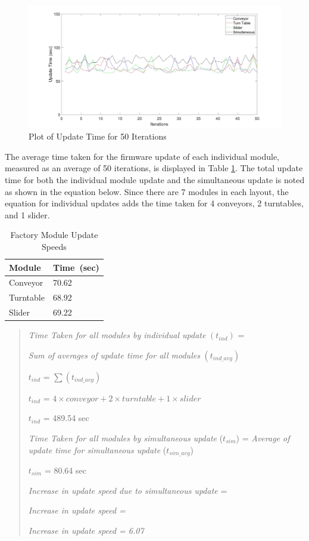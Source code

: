 \begin{figure}
    \centering
    \includegraphics[scale=0.2]{images/UpdateTimes.jpg}
    \caption{Plot of Update Time for 50 Iterations}
    \label{fig:updateTimes}
\end{figure}

The average time taken for the firmware update of each individual module, measured as an average of 50 iterations, is displayed in Table \ref{tab:speed}. The total update time for both the individual module update and the simultaneous update is noted as shown in the equation below. Since there are 7 modules in each layout, the equation for individual updates adds the time taken for 4 conveyors, 2 turntables, and 1 slider.

\begin{table}[h!]
    \centering
\begin{tabular}{ | m{3cm} | m{2cm} | } 
  \hline
  \textbf{Module}&\textbf{Time\ (sec)} \\ 
  \hline
  Conveyor&70.62 \\ 
  \hline
  Turntable& 68.92 \\ 
  \hline
  Slider&69.22 \\
  \hline
\end{tabular}
    \caption{Factory Module Update Speeds}
    \label{tab:speed}
\end{table}

\begin{quote}
           \textit{Time Taken for all modules by individual update} $(t_{ind})$ =
       
       \textit{Sum of averages of update time for all modules} $(t_{ind\_avg})$

     \centering  $t_{ind}$ = $\sum(t_{ind\_avg})$

     \centering  $t_{ind}$ = $4\times conveyor + 2\times turntable + 1\times slider$
     
     \centering $t_{ind}$ = 489.54 sec
     
     \textit{Time Taken for all modules by simultaneous update} ($t_{sim}$) = \textit{Average of update time for simultaneous update} ($t_{sim\_avg}$)
    
     $t_{sim}$ = 80.64 sec
     
     \textit{Increase in update speed due to simultaneous update } = 
     
     \textit{Increase in update speed =  }
     
     \textit{Increase in update speed = 6.07}
\end{quote}

